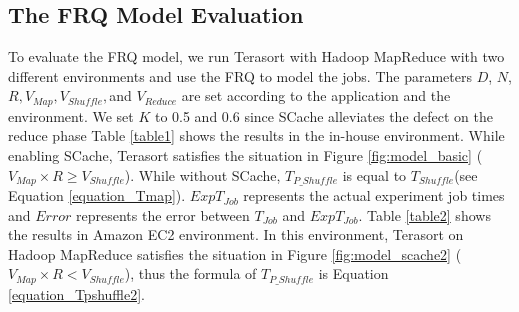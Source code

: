 \subsection{The FRQ Model Evaluation}\label{model_evaluation}
To evaluate the FRQ model, we run Terasort with Hadoop MapReduce with two different environments and use the FRQ to model the jobs.
The parameters \(D\), \(N\), \(R, V_{Map}, V_{Shuffle},\)and \(V_{Reduce}\) are set according to the application and the environment.
We set \(K\) to 0.5 and 0.6 since SCache alleviates the defect on the reduce phase
Table \ref{table1} shows the results in the in-house environment.
While enabling SCache, Terasort satisfies the situation in Figure \ref{fig:model_basic} (\(V_{Map} \times R \ge V_{Shuffle}\)). 
While without SCache, \(T_{P\_Shuffle}\) is equal to \(T_{Shuffle}\)(see Equation \ref{equation_Tmap}).
\(ExpT_{Job}\) represents the actual experiment job times and
\(Error\) represents the error between \(T_{Job}\) and \(ExpT_{Job}\). 
Table \ref{table2} shows the results in Amazon EC2 environment.
In this environment, Terasort on Hadoop MapReduce satisfies the situation in Figure \ref{fig:model_scache2} (\(V_{Map} \times R < V_{Shuffle}\)), thus the formula of \(T_{P\_Shuffle}\) is Equation \ref{equation_Tpshuffle2}. 

